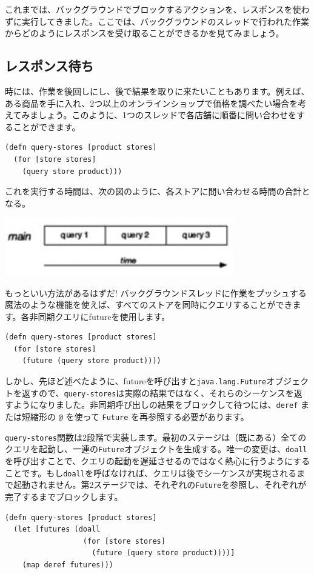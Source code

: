 これまでは、バックグラウンドでブロックするアクションを、レスポンスを使わずに実行してきました。ここでは、バックグラウンドのスレッドで行われた作業からどのようにレスポンスを受け取ることができるかを見てみましょう。

\subsection{レスポンス待ち}

時には、作業を後回しにし、後で結果を取りに来たいこともあります。例えば、ある商品を手に入れ、2つ以上のオンラインショップで価格を調べたい場合を考えてみましょう。このように、1つのスレッドで各店舗に順番に問い合わせをすることができます。

\begin{lstlisting}[numbers=none]
(defn query-stores [product stores]
  (for [store stores]
    (query store product)))
\end{lstlisting}

これを実行する時間は、次の図のように、各ストアに問い合わせる時間の合計となる。

\includegraphics[width=10cm]{fig_05_003.eps}

もっといい方法があるはずだ! バックグラウンドスレッドに作業をプッシュする魔法のような機能を使えば、すべてのストアを同時にクエリすることができます。各非同期クエリにfutureを使用します。


\begin{lstlisting}[numbers=none]
(defn query-stores [product stores]
  (for [store stores]
    (future (query store product))))
\end{lstlisting}

しかし、先ほど述べたように、futureを呼び出すと\texttt{java.lang.Future}オブジェクトを返すので、\texttt{query-stores}は実際の結果ではなく、それらのシーケンスを返すようになりました。非同期呼び出しの結果をブロックして待つには、\texttt{deref} または短縮形の \texttt{@} を使って \texttt{Future} を再参照する必要があります。

\texttt{query-stores}関数は2段階で実装します。最初のステージは（既にある）全てのクエリを起動し、一連の\texttt{Future}オブジェクトを生成する。唯一の変更は、\texttt{doall}を呼び出すことで、クエリの起動を遅延させるのではなく熱心に行うようにすることです。もし\texttt{doall}を呼ばなければ、クエリは後でシーケンスが実現されるまで起動されません。第2ステージでは、それぞれの\texttt{Future}を参照し、それぞれが完了するまでブロックします。


\begin{lstlisting}[numbers=none]
(defn query-stores [product stores]
  (let [futures (doall
                  (for [store stores]
                    (future (query store product))))]
    (map deref futures)))
\end{lstlisting}







